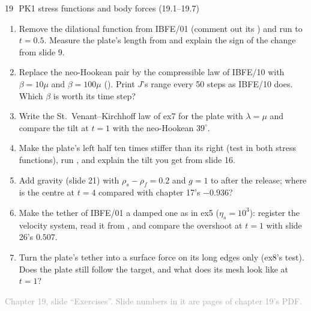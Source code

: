 \documentclass[aspectratio=169,11pt]{beamer}
\newcommand{\sourcecredit}[1]{\vfill\begin{flushright}\tiny\textcolor{DarkGray}{#1}\end{flushright}}
\begin{document}
\begin{frame}{19\,\textbullet\ PK1 stress functions and body forces (19.1--19.7)}
\label{fr:c19x1}
\footnotesize
\begin{enumerate}
  \item[19.1] Remove the dilational function from IBFE/01 (comment out its ) and run  to $t = 0.5$. Measure the plate's length from  and explain the sign of the change from slide 9.
  \item[19.2] Replace the neo-Hookean pair by the compressible law of IBFE/10 with $\beta = 10\mu$ and $\beta = 100\mu$ (). Print $J$'s range every 50 steps as IBFE/10 does. Which $\beta$ is worth its time step?
  \item[19.3] Write the St.\ Venant--Kirchhoff law of ex7 for the plate with $\lambda = \mu$ and compare the tilt at $t = 1$ with the neo-Hookean $39^\circ$.
  \item[19.4] Make the plate's left half ten times stiffer than its right (test  in both stress functions), run , and explain the tilt you get from slide 16.
  \item[19.5] Add gravity (slide 21) with $\rho_s - \rho_f = 0.2$ and $g = 1$ to  after the release; where is the centre at $t = 4$ compared with chapter 17's $-0.936$?
  \item[19.6] Make the tether of IBFE/01 a damped one as in ex5 ($\eta_s = 10^3$): register the velocity system, read it from , and compare the overshoot at $t = 1$ with slide 26's $0.507$.
  \item[19.7] Turn the plate's tether into a surface force on its long edges only (ex8's  test). Does the plate still follow the target, and what does its mesh look like at $t = 1$?
\end{enumerate}
\sourcecredit{Chapter 19, slide ``Exercises''. Slide numbers in it are pages of chapter 19's PDF.}
\end{frame}
\end{document}
